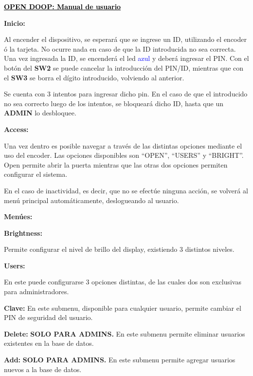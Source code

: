 \begin{center}
\textcolor{black}{\huge{\textbf{\underline{OPEN DOOP: Manual de usuario}}}}
\end{center}

\begin{center}
\textbf{\LARGE{Inicio:}}
\end{center}

Al encender el dispositivo, se esperará que se ingrese un ID, utilizando el encoder ó la tarjeta. No ocurre nada en caso de que la ID introducida no sea correcta. Una vez ingresada la ID, se encenderá el led \textcolor{blue}{azul} y deberá ingresar el PIN. Con el botón del \textbf{SW2} se puede cancelar la introducción del PIN/ID, mientras que con el \textbf{SW3} se borra el dígito introducido, volviendo al anterior.

Se cuenta con 3 intentos para ingresar dicho pin. En el caso de que el introducido no sea correcto luego de los intentos, se bloqueará dicho ID, hasta que un \textbf{ADMIN} lo desbloquee.

\begin{center}
\textbf{\LARGE{Access:}}
\end{center}

Una vez dentro es posible navegar a través de las distintas opciones mediante el uso del encoder. Las opciones disponibles son ``OPEN'', ``USERS'' y ``BRIGHT''. Open permite abrir la puerta mientras que las otras dos opciones permiten configurar el sistema.

En el caso de inactividad, es decir, que no se efectúe ninguna acción, se volverá al menú principal automáticamente, deslogueando al usuario.


\begin{center}
\textbf{\LARGE{Menúes:}}
\end{center}




\textbf{\Large{Brightness:}}


Permite configurar el nivel de brillo del display, existiendo 3 distintos niveles.

\vspace*{0.5cm}

\textbf{\Large{Users:}}

En este puede configurarse 3 opciones distintas, de las cuales dos son exclusivas para administradores.

\vspace*{0.25cm}
\textbf{\large{Clave:}}
En este submenu, disponible para cualquier usuario, permite cambiar el PIN de seguridad del usuario.

\vspace*{0.25cm}
\textbf{\large{Delete:}}
\textbf{SOLO PARA ADMINS.} En este submenu permite eliminar usuarios existentes en la base de datos.

\vspace*{0.25cm}
\textbf{\large{Add:}}
\textbf{SOLO PARA ADMINS.} En este submenu permite agregar usuarios nuevos a la base de datos.